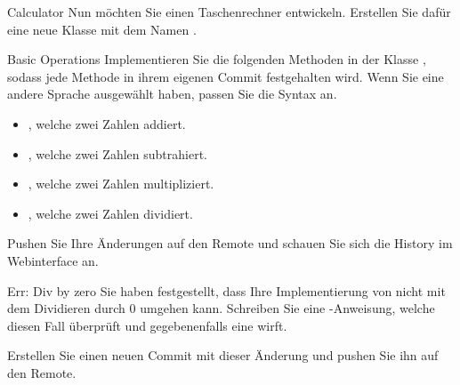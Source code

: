 \documentclass[
    english,
    accentcolor=TUDa-1c,
    fontsize= 12pt,
    a4paper,
    aspectratio=169,
    colorback=true,
    fancy_row_colors,
    boxarc=3pt,
]{algoexercise}
\begin{document}
    \begin{task}{Calculator}
        Nun möchten Sie einen Taschenrechner entwickeln.
        Erstellen Sie dafür eine neue Klasse mit dem Namen .

        \begin{subtask*}{Basic Operations}
            Implementieren Sie die folgenden Methoden in der Klasse , sodass jede Methode in ihrem eigenen Commit festgehalten wird.
            Wenn Sie eine andere Sprache ausgewählt haben, passen Sie die Syntax an.
            \begin{itemize}
                \item {}, welche zwei Zahlen addiert.
                \item {}, welche zwei Zahlen subtrahiert.
                \item {}, welche zwei Zahlen multipliziert.
                \item {}, welche zwei Zahlen dividiert.
            \end{itemize}
            Pushen Sie Ihre Änderungen auf den Remote und schauen Sie sich die History im Webinterface an.
        \end{subtask*}

        \begin{subtask*}{Err: Div by zero}
            Sie haben festgestellt, dass Ihre Implementierung von  nicht mit dem Dividieren durch 0 umgehen kann.
            Schreiben Sie eine -Anweisung, welche diesen Fall überprüft und gegebenenfalls eine  wirft.

            Erstellen Sie einen neuen Commit mit dieser Änderung und pushen Sie ihn auf den Remote.
        \end{subtask*}
    \end{task}
\end{document}
